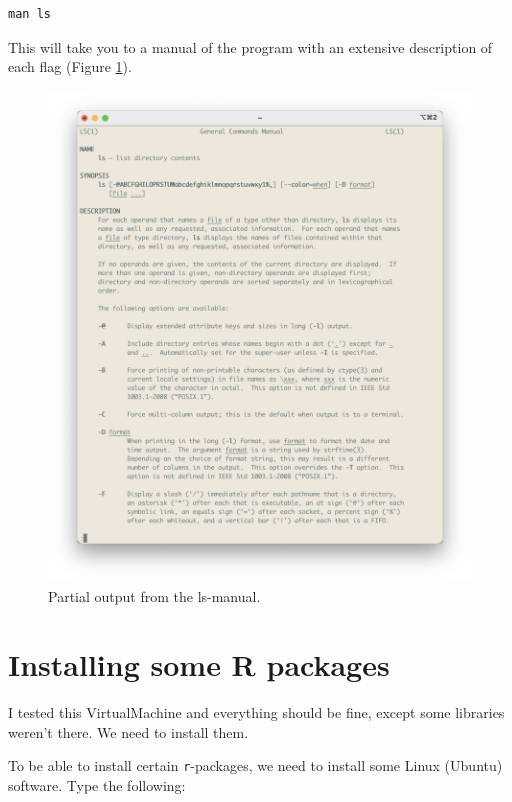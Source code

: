 \documentclass[
]{book}
\newcommand{\passthrough}[1]{#1}
\begin{document}
\begin{lstlisting}
man ls
\end{lstlisting}

This will take you to a manual of the program with an extensive description of each flag (Figure \ref{fig:ls-manual}).

\begin{figure}

{\centering \includegraphics[width=22.64in]{img/ls_manual} 

}

\caption{Partial output from the ls-manual.}\label{fig:ls-manual}
\end{figure}

\hypertarget{installing-some-r-packages}{%
\section{Installing some R packages}\label{installing-some-r-packages}}

I tested this VirtualMachine and everything should be fine, except some libraries weren't there. We need to install them.

To be able to install certain \passthrough{\lstinline!r!}-packages, we need to install some Linux (Ubuntu) software. Type the following:
\end{document}
